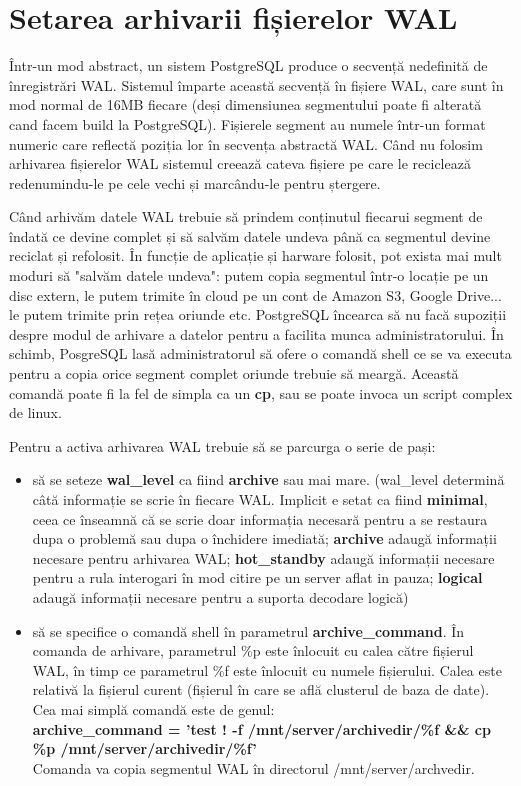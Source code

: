 \section{Setarea arhivarii fișierelor WAL}
Într-un mod abstract, un sistem PostgreSQL produce o secvență nedefinită de înregistrări WAL. Sistemul împarte această secvență în fișiere WAL, care sunt în mod normal de 16MB fiecare (deși dimensiunea segmentului poate fi alterată cand facem build la PostgreSQL). Fișierele segment au numele într-un format numeric care reflectă poziția lor în secvența abstractă WAL. Când nu folosim arhivarea fișierelor WAL sistemul creează cateva fișiere pe care le reciclează redenumindu-le pe cele vechi și marcându-le pentru ștergere.
\par
Când arhivăm datele WAL trebuie să prindem conținutul fiecarui segment de îndată ce devine complet și să salvăm datele undeva până ca segmentul devine reciclat și refolosit. În funcție de aplicație și harware folosit, pot exista mai mult moduri să "salvăm datele undeva": putem copia segmentul într-o locație pe un disc extern, le putem trimite în cloud pe un cont de Amazon S3, Google Drive... le putem trimite prin rețea oriunde etc. PostgreSQL încearca să nu facă supoziții despre modul de arhivare a datelor pentru a facilita munca administratorului. În schimb, PosgreSQL lasă administratorul să ofere o comandă shell ce se va executa pentru a copia orice segment complet oriunde trebuie să meargă. Această comandă poate fi la fel de simpla ca un \textbf{cp}, sau se poate invoca un script complex de linux.
\par 
Pentru a activa arhivarea WAL trebuie să se parcurga o serie de pași:
\begin{itemize}
\item să se seteze \textbf{wal_level} ca fiind \textbf{archive} sau mai mare. (wal_level determină câtă informație se scrie în fiecare WAL. Implicit e setat ca fiind \textbf{minimal}, ceea ce înseamnă că se scrie doar informația necesară pentru a se restaura dupa o problemă sau dupa o închidere imediată; \textbf{archive} adaugă informații necesare pentru arhivarea WAL; \textbf{hot_standby} adaugă informații necesare pentru a rula interogari în mod citire pe un server aflat in pauza; \textbf{logical} adaugă informații necesare pentru a suporta decodare logică)
\item să se specifice o comandă shell în parametrul \textbf{archive_command}. În comanda de arhivare, parametrul \%p este înlocuit cu calea către fișierul WAL, în timp ce parametrul \%f este înlocuit cu numele fișierului. Calea este relativă la fișierul curent (fișierul în care se află clusterul de baza de date). Cea mai simplă comandă este de genul:\\ \textbf{archive_command = 'test ! -f /mnt/server/archivedir/\%f \&\& cp \%p /mnt/server/archivedir/\%f'}\\
Comanda va copia segmentul WAL în directorul /mnt/server/archvedir.
\end{itemize}

